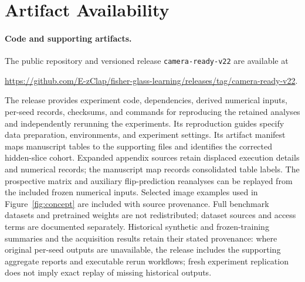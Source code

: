 \section*{Artifact Availability}
\label{sec:artifact-availability}

\paragraph{Code and supporting artifacts.}
The public repository and versioned release \texttt{camera-ready-v22} are available at
\begin{center}
\url{https://github.com/E-zClap/fisher-glass-learning/releases/tag/camera-ready-v22}.
\end{center}
The release provides experiment code, dependencies, derived numerical inputs, per-seed records, checksums, and commands for reproducing the retained analyses and independently rerunning the experiments. Its reproduction guides specify data preparation, environments, and experiment settings. Its artifact manifest maps manuscript tables to the supporting files and identifies the corrected hidden-slice cohort. Expanded appendix sources retain displaced execution details and numerical records; the manuscript map records consolidated table labels. The prospective matrix and auxiliary flip-prediction reanalyses can be replayed from the included frozen numerical inputs. Selected image examples used in Figure~\ref{fig:concept} are included with source provenance. Full benchmark datasets and pretrained weights are not redistributed; dataset sources and access terms are documented separately. Historical synthetic and frozen-training summaries and the acquisition results retain their stated provenance: where original per-seed outputs are unavailable, the release includes the supporting aggregate reports and executable rerun workflows; fresh experiment replication does not imply exact replay of missing historical outputs.
